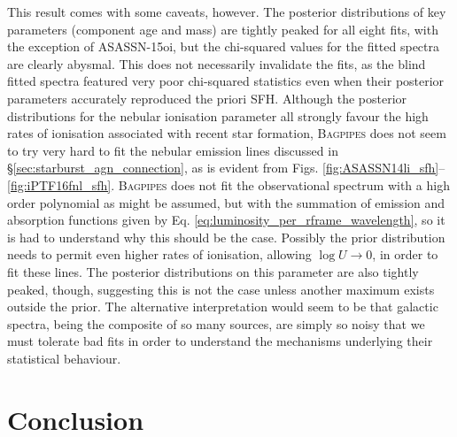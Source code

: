 \documentclass[a4paper,12pt]{article}
\begin{document}
This result comes with some caveats, however. The posterior distributions of
key parameters (component age and mass) are tightly peaked for all eight fits,
with the exception of ASASSN-15oi, but the chi-squared values for the fitted
spectra are clearly abysmal. This does not necessarily invalidate the fits, as
the blind fitted spectra featured very poor chi-squared statistics even when
their posterior parameters accurately reproduced the priori SFH. Although the
posterior distributions for the nebular ionisation parameter all strongly
favour the high rates of ionisation associated with recent star formation,
\textsc{Bagpipes} does not seem to try very hard to fit the nebular emission
lines discussed in \S\ref{sec:starburst_agn_connection}, as is evident from
Figs. \ref{fig:ASASSN14li_sfh}--\ref{fig:iPTF16fnl_sfh}. \textsc{Bagpipes} does
not fit the observational spectrum with a high order polynomial as might be
assumed, but with the summation of emission and absorption functions given by
Eq. \ref{eq:luminosity_per_rframe_wavelength}, so it is had to understand why
this should be the case. Possibly the prior distribution needs to permit even
higher rates of ionisation, allowing $\log U \to 0$, in order to fit these
lines. The posterior distributions on this parameter are also tightly peaked,
though, suggesting this is not the case unless another maximum exists outside
the prior. The alternative interpretation would seem to be that galactic
spectra, being the composite of so many sources, are simply so noisy that we
must tolerate bad fits in order to understand the mechanisms underlying their
statistical behaviour.

\section{Conclusion}\label{sec:conclusion}
\end{document}
